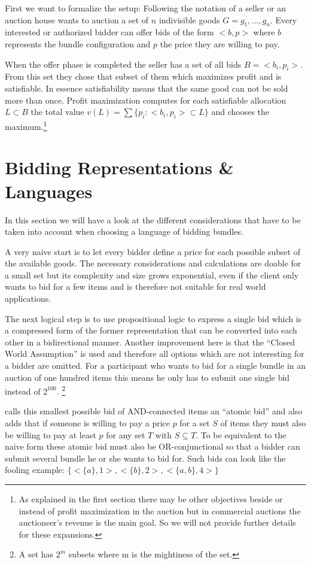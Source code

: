 \documentclass[a4paper]{paper}
\begin{document}
First we want to formalize the setup: Following the notation of \cite[chapter~2]{BH01} a seller or an auction house wants to auction a set of $n$ indivisible goods $G = {g_1, ..., g_n}$. Every interested or authorized bidder can offer bids of the form $<b, p>$ where $b$ represents the bundle configuration and $p$ the price they are willing to pay.

When the offer phase is completed the seller has a set of all bids $B = {<b_i,p_i>}$. From this set they chose that subset of them which maximizes profit and is satisfiable. In essence satisfiability means that the same good can not be sold more than once. Profit maximization computes for each satisfiable allocation $L \subset B$ the total value $v(L) = \sum \{p_i : <b_i,p_i> \subset L\}$ and chooses the maximum.\footnote{As explained in the first section there may be other objectives beside or instead of profit maximization in the auction but in commercial auctions the auctioneer's revenue is the main goal. So we will not provide further details for these expansions.}

\section{Bidding Representations \& Languages}

In this section we will have a look at the different considerations that have to be taken into account when choosing a language of bidding bundles. 

A very naive start is to let every bidder define a price for each possible subset of the available goods. The necessary considerations and calculations are doable for a small set but its complexity and size grows exponential, even if the client only wants to bid for a few items and is therefore not suitable for real world applications.

The next logical step is to use propositional logic to express a single bid which is a compressed form of the former representation that can be converted into each other in a bidirectional manner. Another improvement here is that the ``Closed World Assumption'' is used and therefore all options which are not interesting for a bidder are omitted. For a participant who wants to bid for a single bundle in an auction of one hundred items this means he only has to submit one single bid instead of $2^{100}$. \footnote{A set has $2^m$ subsets where m is the mightiness of the set.}

\cite{Nis00} calls this smallest possible bid of AND-connected items an ``atomic bid'' and also adds that if someone is willing to pay a price $p$ for a set $S$ of items they must also be willing to pay at least $p$ for any set $T$ with $S \subseteq T$. To be equivalent to the naive form these atomic bid must also be OR-conjunctional so that a bidder can submit several bundle he or she wants to bid for. Such bids can look like the fooling example: $\{<\{a\},1>,<\{b\},2>,<\{a,b\},4>\}$
\end{document}
